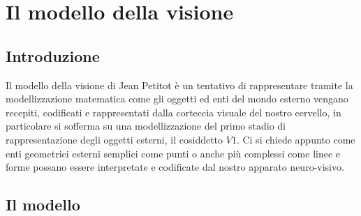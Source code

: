 \chapter{Il modello della visione}
\section{Introduzione} Il modello della visione di Jean Petitot è un tentativo di rappresentare tramite la modellizzazione matematica come gli oggetti ed enti del mondo esterno vengano recepiti, codificati  e rappresentati dalla corteccia visuale del nostro cervello, in particolare si sofferma su una modellizzazione del primo stadio di rappresentazione degli oggetti esterni, il cosiddetto $V1$.
Ci si chiede appunto come enti geometrici esterni semplici come punti o anche più complessi come linee e forme possano essere interpretate e codificate dal nostro apparato neuro-visivo.
\section{Il modello}
